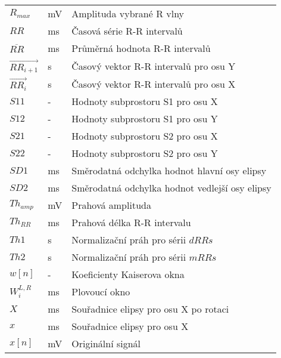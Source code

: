 \begin{table}[H]
\begin{center}
\begin{tabular}{p{2.5cm}p{2.5cm}p{9.25cm}}
			$R_{max}$                   & mV       & Amplituda vybrané R vlny                       \\
			$RR$                        & ms       & Časová série R-R intervalů                     \\
			$\overline{RR}$             & ms       & Průměrná hodnota R-R intervalů                 \\
			$\overrightarrow{RR_{i+1}}$ & s        & Časový vektor R-R intervalů pro osu Y          \\
			$\overrightarrow{RR_i}$     & s        & Časový vektor R-R intervalů pro osu X          \\
			$S11$                       & -        & Hodnoty subprostoru S1 pro osu X               \\
			$S12$                       & -        & Hodnoty subprostoru S1 pro osu Y               \\
			$S21$                       & -        & Hodnoty subprostoru S2 pro osu X               \\
			$S22$                       & -        & Hodnoty subprostoru S2 pro osu Y               \\
			$SD1$                       & ms       & Směrodatná odchylka hodnot hlavní osy elipsy   \\
			$SD2$                       & ms       & Směrodatná odchylka hodnot vedlejší osy elipsy \\
			$Th_{amp}$                  & mV       & Prahová amplituda                              \\
			$Th_{RR}$                   & ms       & Prahová délka R-R intervalu                    \\
			$Th1$                       & s        & Normalizační práh pro sérii $dRRs$             \\
			$Th2$                       & s        & Normalizační práh pro sérii $mRRs$             \\
			$w[n]$                      & -        & Koeficienty Kaiserova okna                     \\
			$W_i^{L,R}$                 & ms       & Plovoucí okno                                  \\
			$X$                         & ms       & Souřadnice elipsy pro osu X po rotaci          \\
			$x$                         & ms       & Souřadnice elipsy pro osu X                    \\
			$x[n]$                      & mV       & Originální signál                              \\

\end{tabular}
\end{center}
\end{table}
